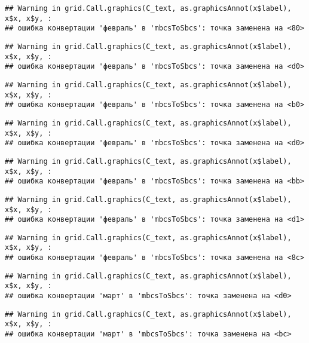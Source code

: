 \documentclass[
]{article}
\begin{document}
\begin{verbatim}
## Warning in grid.Call.graphics(C_text, as.graphicsAnnot(x$label), x$x, x$y, :
## ошибка конвертации 'февраль' в 'mbcsToSbcs': точка заменена на <80>
\end{verbatim}

\begin{verbatim}
## Warning in grid.Call.graphics(C_text, as.graphicsAnnot(x$label), x$x, x$y, :
## ошибка конвертации 'февраль' в 'mbcsToSbcs': точка заменена на <d0>
\end{verbatim}

\begin{verbatim}
## Warning in grid.Call.graphics(C_text, as.graphicsAnnot(x$label), x$x, x$y, :
## ошибка конвертации 'февраль' в 'mbcsToSbcs': точка заменена на <b0>
\end{verbatim}

\begin{verbatim}
## Warning in grid.Call.graphics(C_text, as.graphicsAnnot(x$label), x$x, x$y, :
## ошибка конвертации 'февраль' в 'mbcsToSbcs': точка заменена на <d0>
\end{verbatim}

\begin{verbatim}
## Warning in grid.Call.graphics(C_text, as.graphicsAnnot(x$label), x$x, x$y, :
## ошибка конвертации 'февраль' в 'mbcsToSbcs': точка заменена на <bb>
\end{verbatim}

\begin{verbatim}
## Warning in grid.Call.graphics(C_text, as.graphicsAnnot(x$label), x$x, x$y, :
## ошибка конвертации 'февраль' в 'mbcsToSbcs': точка заменена на <d1>
\end{verbatim}

\begin{verbatim}
## Warning in grid.Call.graphics(C_text, as.graphicsAnnot(x$label), x$x, x$y, :
## ошибка конвертации 'февраль' в 'mbcsToSbcs': точка заменена на <8c>
\end{verbatim}

\begin{verbatim}
## Warning in grid.Call.graphics(C_text, as.graphicsAnnot(x$label), x$x, x$y, :
## ошибка конвертации 'март' в 'mbcsToSbcs': точка заменена на <d0>
\end{verbatim}

\begin{verbatim}
## Warning in grid.Call.graphics(C_text, as.graphicsAnnot(x$label), x$x, x$y, :
## ошибка конвертации 'март' в 'mbcsToSbcs': точка заменена на <bc>
\end{verbatim}
\end{document}
